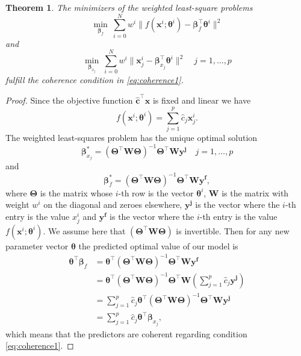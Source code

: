 \documentclass{article}
\theoremstyle{plain}
\newtheorem{theorem}{Theorem}[section]
\theoremstyle{definition}
\theoremstyle{remark}
\begin{document}
\begin{theorem}\label{thm:provably_coherent}
The minimizers of the weighted least-square problems
\[
\min_{\bm{\beta}_{f}} \ \sum_{i=0}^{N} w^i\| f(\bm{x}^i;\bm{\theta}^i) - \bm{\beta}_{f}^\intercal\bm{\theta}^i \|^2 \]
and 
\[
\min_{\bm{\beta}_{x_j}} \ \sum_{i=0}^{N} w^i\| \bm{x}^i_j - \bm{\beta}_{x_j}^\intercal\bm{\theta}^i \|^2 \quad j=1,\ldots ,p
\]
fulfill the coherence condition in \eqref{eq:coherence1}.
\end{theorem}
\begin{proof}
Since the objective function $\bm{\hat c}^\intercal \bm{x}$ is fixed and linear we have
\[
f(\bm{x}^i;\bm{\theta}^i) = \sum_{j=1}^{p} \hat c_j \bm{x}^i_j.
\]
The weighted least-squares problem has the unique optimal solution
\[
\bm{\beta}_{x_j}^* = (\bm{\Theta}^\intercal \bm{W}\bm{\Theta})^{-1} \bm{\Theta}^\intercal \bm{W} \bm{y^j} \quad j=1,\ldots ,p
\]
and 
\[
\bm{\beta}_{f}^* = (\bm{\Theta}^\intercal \bm{W}\bm{\Theta})^{-1} \bm{\Theta}^\intercal \bm{W} \bm{y^f},
\]
where $\bm{\Theta}$ is the matrix whose $i$-th row is the vector $\bm{\theta}^i$, $\bm{W}$ is the matrix with weight $w^i$ on the diagonal and zeroes elsewhere, $\bm{y^j}$ is the vector where the $i$-th entry is the value $x_j^i$ and $\bm{y^f}$ is the vector where the $i$-th entry is the value $f(\bm{x}^i;\bm{\theta}^i)$. We assume here that $(\bm{\Theta}^\intercal \bm{W}\bm{\Theta})$ is invertible. Then for any new parameter vector $\bm{\theta}$ the predicted optimal value of our model is
\begin{align*}
\bm{\theta}^\intercal\bm{\beta}_{f} & = \bm{\theta}^\intercal (\bm{\Theta}^\intercal \bm{W}\bm{\Theta})^{-1} \bm{\Theta}^\intercal \bm{W} \bm{y^f}  \\
& = \bm{\theta}^\intercal (\bm{\Theta}^\intercal \bm{W} \bm{\Theta})^{-1} \bm{\Theta}^\intercal \bm{W} \left( \sum_{j=1}^{p} \hat c_j \bm{y^{j}}\right) \\
& = \sum_{j=1}^{p} \hat c_j \bm{\theta}^\intercal (\bm{\Theta}^\intercal \bm{W}\bm{\Theta})^{-1} \bm{\Theta}^\intercal \bm{W} \bm{y^{j}} \\
& = \sum_{j=1}^{p} \hat c_j \bm{\theta}^\intercal\bm{\beta}_{x_j},
\end{align*}
which means that the predictors are coherent regarding condition \eqref{eq:coherence1}. 
\end{proof}

\end{document}
